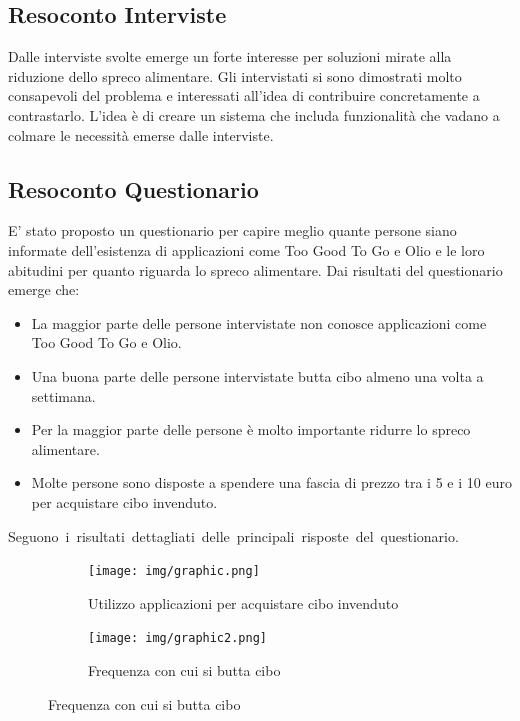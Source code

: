\documentclass{article}
\begin{document}
\subsection{Resoconto Interviste}
Dalle interviste svolte emerge un forte interesse per soluzioni mirate alla riduzione dello spreco alimentare. 
Gli intervistati si sono dimostrati molto consapevoli del problema e interessati all’idea di contribuire concretamente a contrastarlo.
\newline
L'idea è di creare un sistema che includa funzionalità che vadano a colmare le necessità emerse dalle interviste.

\subsection{Resoconto Questionario}
E' stato proposto un questionario per capire meglio quante persone siano informate dell'esistenza di applicazioni come Too Good To Go e Olio e le loro abitudini per quanto riguarda lo spreco alimentare.
\newline
Dai risultati del questionario emerge che:
\begin{itemize}
    \item La maggior parte delle persone intervistate non conosce applicazioni come Too Good To Go e Olio.
    \item Una buona parte delle persone intervistate butta cibo almeno una volta a settimana.
    \item Per la maggior parte delle persone è molto importante ridurre lo spreco alimentare.
    \item Molte persone sono disposte a spendere una fascia di prezzo tra i 5 e i 10 euro per acquistare cibo invenduto.
\end{itemize}

\hbox{Seguono i risultati dettagliati delle principali risposte del questionario.}

\begin{figure}[H]
    \centering
    \begin{subfigure}{0.40\textwidth}
        \centering
        \texttt{[image: img/graphic.png]}
        \caption{Utilizzo applicazioni per acquistare cibo invenduto}
    \end{subfigure}
    \hfill
    \begin{subfigure}{0.40\textwidth}
        \centering
        \texttt{[image: img/graphic2.png]}
        \caption{Frequenza con cui si butta cibo}
    \end{subfigure}
\end{figure}
\end{document}
